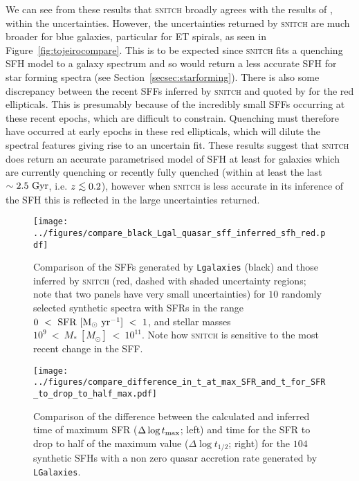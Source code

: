 \documentclass[useAMS,usenatbib]{mn2e}
\def\lesssim{\mathrel{\hbox{\rlap{\hbox{\lower3pt\hbox{$\sim$}}}\hbox{\raise2pt\hbox{$<$}}}}}
\begin{document}
We can see from these results that \textsc{snitch} broadly agrees with the results of \citeauthor{tojeiro13}, within the uncertainties. However, the uncertainties returned by \textsc{snitch} are much broader for blue galaxies, particular for ET spirals, as seen in Figure~\ref{fig:tojeirocompare}. This is to be expected since \textsc{snitch} fits a quenching SFH model to a galaxy spectrum and so would return a less accurate SFH for star forming spectra (see Section~\ref{secsec:starforming}). There is also some discrepancy between the recent SFFs inferred by \textsc{snitch} and quoted by \citeauthor{tojeiro13} for the red ellipticals. This is presumably because of the incredibly small SFFs occurring at these recent epochs, which are difficult to constrain. Quenching must therefore have occurred at early epochs in these red ellipticals, which will dilute the spectral features giving rise to an uncertain fit.  These results suggest that \textsc{snitch} does return an accurate parametrised model of SFH at least for galaxies which are currently quenching or recently fully quenched (within at least the last $\sim2.5~\rm{Gyr}$, i.e. $z \lesssim 0.2$), however when \textsc{snitch} is less accurate in its inference of the SFH this is reflected in the large uncertainties returned.   

\begin{figure}
\centering
\texttt{[image: ../figures/compare\_black\_Lgal\_quasar\_sff\_inferred\_sfh\_red.pdf]}
\caption{Comparison of the SFFs generated by \texttt{Lgalaxies} (black) and those inferred by \textsc{snitch} (red, dashed with shaded uncertainty regions; note that two panels have very small uncertainties) for $10$ randomly selected synthetic spectra with SFRs in the range $0~<~\rm{SFR}~[M_{\odot}~\rm{yr}^{-1}]~<~1$, and stellar masses $10^9~<~M_{*}~[M_{\odot}]~<~10^{11}$. Note how \textsc{snitch} is sensitive to the most recent change in the SFF.}
\label{fig:lgalsfhs}
\end{figure}

\begin{figure}
\centering
\texttt{[image: ../figures/compare\_difference\_in\_t\_at\_max\_SFR\_and\_t\_for\_SFR\_to\_drop\_to\_half\_max.pdf]}
\caption{Comparison of the difference between the calculated and inferred time of maximum SFR ($\Delta \log t_{\rm{max}}$; left) and time for the SFR to drop to half of the maximum value ($\Delta \log t_{1/2}$; right) for the $104$ synthetic SFHs with a non zero quasar accretion rate generated by \texttt{LGalaxies}.}
\label{fig:genlgalsfhs}
\end{figure}
\end{document}
